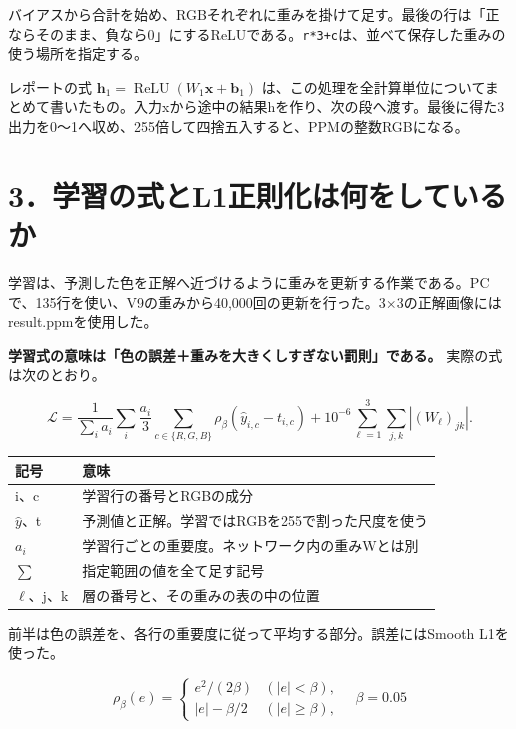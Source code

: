 \documentclass[
  11pt,
  a4paper,
]{article}
\begin{document}
バイアスから合計を始め、RGBそれぞれに重みを掛けて足す。最後の行は「正ならそのまま、負なら0」にするReLUである。\texttt{r*3+c}は、並べて保存した重みの使う場所を指定する。

レポートの式
\(\boldsymbol h_1=\operatorname{ReLU}(W_1\boldsymbol x+\boldsymbol b_1)\)
は、この処理を全計算単位についてまとめて書いたもの。入力xから途中の結果hを作り、次の段へ渡す。最後に得た3出力を0〜1へ収め、255倍して四捨五入すると、PPMの整数RGBになる。

\newpage

\section{3．学習の式とL1正則化は何をしているか}\label{ux5b66ux7fd2ux306eux5f0fux3068l1ux6b63ux5247ux5316ux306fux4f55ux3092ux3057ux3066ux3044ux308bux304b}

学習は、予測した色を正解へ近づけるように重みを更新する作業である。PCで、135行を使い、V9の重みから40,000回の更新を行った。3×3の正解画像にはresult.ppmを使用した。

\textbf{学習式の意味は「色の誤差＋重みを大きくしすぎない罰則」である。}
実際の式は次のとおり。

\[
\mathcal L=\frac{1}{\sum_i a_i}\sum_i\frac{a_i}{3}\sum_{c\in\{R,G,B\}}
\rho_\beta(\widehat y_{i,c}-t_{i,c})
+10^{-6}\sum_{\ell=1}^{3}\sum_{j,k}|(W_\ell)_{jk}|.
\]

\begin{longtable}[]{@{}ll@{}}
\toprule\noalign{}
記号 & 意味 \\
\midrule\noalign{}
\endhead
\bottomrule\noalign{}
\endlastfoot
i、c & 学習行の番号とRGBの成分 \\
\(\widehat y\)、t & 予測値と正解。学習ではRGBを255で割った尺度を使う \\
\(a_i\) & 学習行ごとの重要度。ネットワーク内の重みWとは別 \\
\(\sum\) & 指定範囲の値を全て足す記号 \\
\(\ell\)、j、k & 層の番号と、その重みの表の中の位置 \\
\end{longtable}

前半は色の誤差を、各行の重要度に従って平均する部分。誤差にはSmooth
L1を使った。

\[\rho_\beta(e)=\begin{cases}e^2/(2\beta)&(|e|<\beta),\\ |e|-\beta/2&(|e|\geq\beta),\end{cases}\quad\beta=0.05\]
\end{document}
